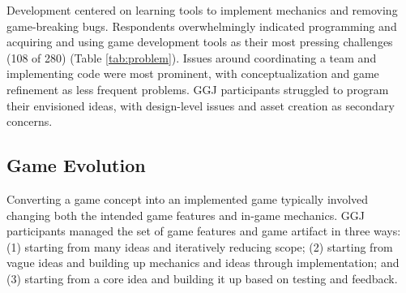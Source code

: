 \documentclass{sig-alternate}
\begin{document}
Development centered on learning tools to implement mechanics and removing game-breaking bugs. 
Respondents overwhelmingly indicated programming and acquiring and using game development tools as their most pressing challenges (108 of 280) (Table \ref{tab:problem}).
Issues around coordinating a team and implementing code were most prominent, with conceptualization and game refinement as less frequent problems.
GGJ participants struggled to program their envisioned ideas, with design-level issues and asset creation as secondary concerns.




\subsection{Game Evolution}
Converting a game concept into an implemented game typically involved changing both the intended game features and in-game mechanics. 
GGJ participants managed the set of game features and game artifact in three ways:
(1) starting from many ideas and iteratively reducing scope;
(2) starting from vague ideas and building up mechanics and ideas through implementation;
and
(3) starting from a core idea and building it up based on testing and feedback.
\end{document}
